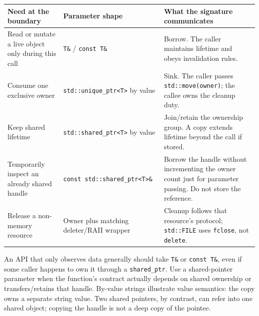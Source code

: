\hypertarget{01-foundations-i-ch003-the-call-site-decision}{}

{\def\LTcaptype{none} %
\begin{longtable}[]{@{}
  >{\raggedright\arraybackslash}p{}
  >{\raggedright\arraybackslash}p{}
  >{\raggedright\arraybackslash}p{}@{}}
\toprule\noalign{}
\begin{minipage}[b]{\linewidth}\raggedright
Need at the boundary
\end{minipage} & \begin{minipage}[b]{\linewidth}\raggedright
Parameter shape
\end{minipage} & \begin{minipage}[b]{\linewidth}\raggedright
What the signature communicates
\end{minipage} \\
\midrule\noalign{}
\endhead
\bottomrule\noalign{}
\endlastfoot
Read or mutate a live object only during this call & \texttt{T\&} / \texttt{const\ T\&} & Borrow. The caller maintains lifetime and obeys invalidation rules. \\
Consume one exclusive owner & \texttt{std::unique\_ptr\textless{}T\textgreater{}} by value & Sink. The caller passes \texttt{std::move(owner)}; the callee owns the cleanup duty. \\
Keep shared lifetime & \texttt{std::shared\_ptr\textless{}T\textgreater{}} by value & Join/retain the ownership group. A copy extends lifetime beyond the call if stored. \\
Temporarily inspect an already shared handle & \texttt{const\ std::shared\_ptr\textless{}T\textgreater{}\&} & Borrow the handle without incrementing the owner count just for parameter passing. Do not store the reference. \\
Release a non-memory resource & Owner plus matching deleter/RAII wrapper & Cleanup follows that resource's protocol; \texttt{std::FILE} uses \texttt{fclose}, not \texttt{delete}. \\
\end{longtable}
}

An API that only observes data generally should take \texttt{T\&} or \texttt{const\ T\&}, even if some caller happens to own it through a \texttt{shared\_ptr}. Use a shared-pointer parameter when the function's contract actually depends on shared ownership or transfers/retains that handle. By-value strings illustrate value semantics: the copy owns a separate string value. Two shared pointers, by contrast, can refer into one shared object; copying the handle is not a deep copy of the pointee.


